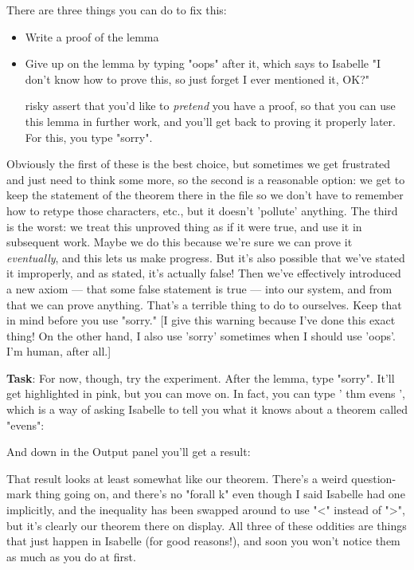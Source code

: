 There are three things you can do to fix this:

\begin{itemize}
    \item Write a proof of the lemma
    \item Give up on the lemma by typing "oops" after it, which says to Isabelle "I don't know how to prove this, so just forget I ever mentioned it, OK?" 
    \item [risky] assert that you'd like to \textit{pretend} you have a proof, so that you can use this lemma in further work, and you'll get back to proving it properly later. For this, you type "sorry".
\end{itemize}

Obviously the first of these is the best choice, but sometimes we get frustrated and just need to think some more, so the second is a reasonable option: we get to keep the statement of the theorem there in the file so we don't have to remember how to retype those characters, etc., but it doesn't 'pollute' anything. The third is the worst: we treat this unproved thing as if it were true, and use it in subsequent work. Maybe we do this because we're sure we can prove it \textit{eventually}, and this lets us make progress. But it's also possible that we've stated it improperly, and as stated, it's actually false! Then we've effectively introduced a new axiom --- that some false statement is true --- into our system, and from that we can prove anything. That's a terrible thing to do to ourselves. Keep that in mind before you use "sorry." [I give this warning because I've done this exact thing! On the other hand, I also use 'sorry' sometimes when I should use 'oops'. I'm human, after all.] 

\textbf{Task}: For now, though, try the experiment. After the lemma, type "sorry". It'll get highlighted in pink, but you can move on. In fact, you can type ' thm evens ', which is a way of asking Isabelle to tell you what it knows about a theorem called "evens": 

And down in the Output panel you'll get a result:

That result looks at least somewhat like our theorem. There's a weird question-mark thing going on, and there's no "forall k" even though I said Isabelle had one implicitly, and the inequality has been swapped around to use "<" instead of ">", but it's clearly our theorem there on display. All three of these oddities are things that just happen in Isabelle (for good reasons!), and soon you won't notice them as much as you do at first. 

